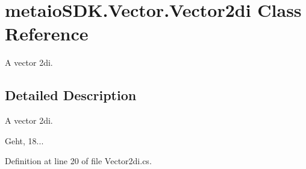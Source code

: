 \section{metaio\-S\-D\-K.\-Vector.\-Vector2di Class Reference}
\label{classmetaio_s_d_k_1_1_vector_1_1_vector2di}


A vector 2di.  




\subsection{Detailed Description}
A vector 2di. 

Geht, 18... 

Definition at line 20 of file Vector2di.\-cs.

